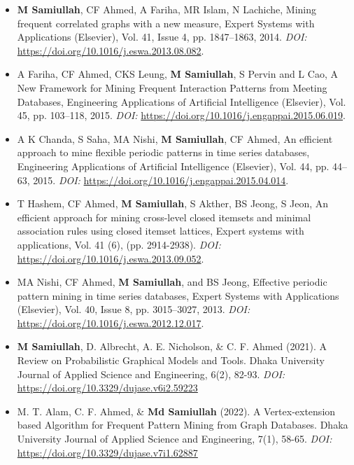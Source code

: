 \documentclass{my_cv}
\begin{document}
\begin{itemize}[noitemsep]
    \item \textbf{M Samiullah}, CF Ahmed, A Fariha, MR Islam, N Lachiche, Mining frequent correlated graphs with a new measure, Expert Systems with Applications (Elsevier), Vol. 41, Issue 4, pp. 1847–1863,  2014. {\em DOI:} \url{https://doi.org/10.1016/j.eswa.2013.08.082}.
    \item A Fariha, CF Ahmed, CKS Leung, \textbf{M Samiullah}, S Pervin and L Cao, A New Framework for Mining Frequent Interaction Patterns from Meeting Databases, Engineering Applications of Artificial Intelligence (Elsevier), Vol. 45, pp. 103–118,  2015. {\em DOI:} \url{https://doi.org/10.1016/j.engappai.2015.06.019}.
    \item A K Chanda, S Saha, MA Nishi, \textbf{M Samiullah}, CF Ahmed, An efficient approach to mine flexible periodic patterns in time series databases, Engineering Applications of Artificial Intelligence (Elsevier), Vol. 44, pp. 44–63, 2015. {\em DOI:} \url{https://doi.org/10.1016/j.engappai.2015.04.014}.
    \item T Hashem, CF Ahmed, {\bf M Samiullah}, S Akther, BS Jeong, S Jeon, An efficient approach for mining cross-level closed itemsets and minimal association rules using closed itemset lattices, Expert systems with applications, Vol. 41 (6), (pp. 2914-2938). {\em DOI:} \url{https://doi.org/10.1016/j.eswa.2013.09.052}.
    \item MA Nishi, CF Ahmed, \textbf{M Samiullah}, and BS Jeong, Effective periodic pattern mining in time series databases, Expert Systems with Applications (Elsevier), Vol. 40, Issue 8, pp. 3015–3027,  2013. {\em DOI:} \url{https://doi.org/10.1016/j.eswa.2012.12.017}.
    \item \textbf{M Samiullah}, D. Albrecht, A. E. Nicholson, \& C. F. Ahmed (2021). A Review on Probabilistic Graphical Models and Tools. Dhaka University Journal of Applied Science and Engineering, 6(2), 82-93. {\em DOI:} \url{https://doi.org/10.3329/dujase.v6i2.59223}
    \item M. T. Alam, C. F. Ahmed, \& \textbf{Md Samiullah} (2022). A Vertex-extension based Algorithm for Frequent Pattern Mining from Graph Databases. Dhaka University Journal of Applied Science and Engineering, 7(1), 58-65. {\em DOI:} \url{https://doi.org/10.3329/dujase.v7i1.62887}
\end{itemize}
\end{document}

